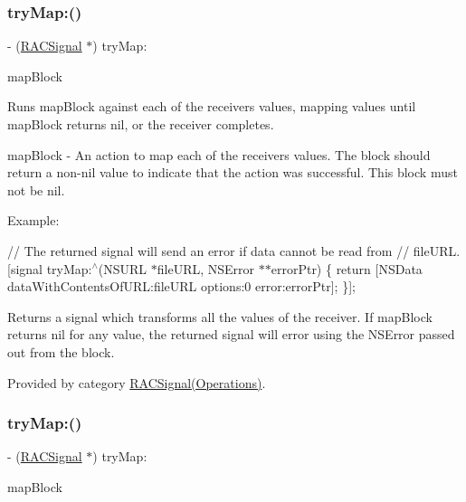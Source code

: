 \subsubsection{\texorpdfstring{try\+Map\+:()}{tryMap:()}\hspace{0.1cm}{\footnotesize\ttfamily [2/3]}}
{\footnotesize\ttfamily -\/ (\mbox{\hyperlink{interface_r_a_c_signal}{R\+A\+C\+Signal}} $\ast$) try\+Map\+: \begin{DoxyParamCaption}\item[{(id($^\wedge$)(id value, N\+S\+Error $\ast$$\ast$error\+Ptr))}]{map\+Block }\end{DoxyParamCaption}}

Runs {\ttfamily map\+Block} against each of the receiver\textquotesingle{}s values, mapping values until {\ttfamily map\+Block} returns nil, or the receiver completes.

map\+Block -\/ An action to map each of the receiver\textquotesingle{}s values. The block should return a non-\/nil value to indicate that the action was successful. This block must not be nil.

Example\+:

// The returned signal will send an error if data cannot be read from // {\ttfamily file\+U\+RL}. \mbox{[}signal try\+Map\+:$^\wedge$(N\+S\+U\+RL $\ast$file\+U\+RL, N\+S\+Error $\ast$$\ast$error\+Ptr) \{ return \mbox{[}N\+S\+Data data\+With\+Contents\+Of\+U\+RL\+:file\+U\+RL options\+:0 error\+:error\+Ptr\mbox{]}; \}\mbox{]};

Returns a signal which transforms all the values of the receiver. If {\ttfamily map\+Block} returns nil for any value, the returned signal will error using the {\ttfamily N\+S\+Error} passed out from the block. 

Provided by category \mbox{\hyperlink{category_r_a_c_signal_07_operations_08_a282c8989886b5b9a75e4ecb298221b58}{R\+A\+C\+Signal(\+Operations)}}.

\mbox{\label{interface_r_a_c_signal_a282c8989886b5b9a75e4ecb298221b58}} 
\subsubsection{\texorpdfstring{try\+Map\+:()}{tryMap:()}\hspace{0.1cm}{\footnotesize\ttfamily [3/3]}}
{\footnotesize\ttfamily -\/ (\mbox{\hyperlink{interface_r_a_c_signal}{R\+A\+C\+Signal}} $\ast$) try\+Map\+: \begin{DoxyParamCaption}\item[{(id($^\wedge$)(id value, N\+S\+Error $\ast$$\ast$error\+Ptr))}]{map\+Block }\end{DoxyParamCaption}}

